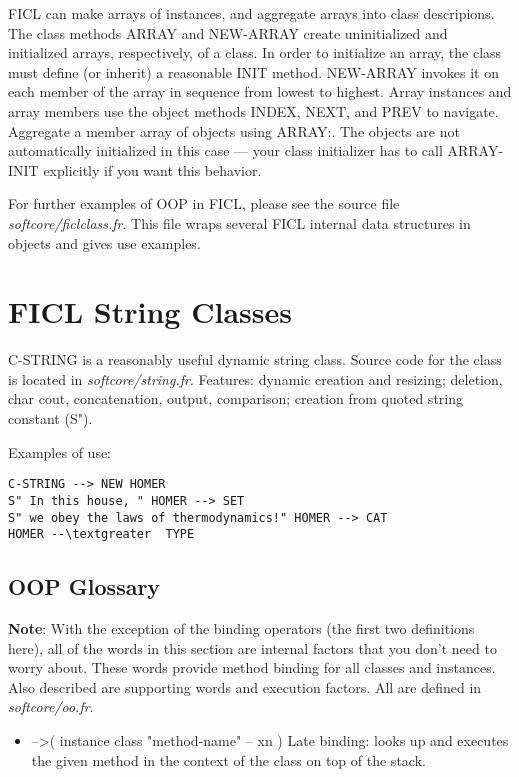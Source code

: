 \begin{;stlisting}[frame=single]
FICL can make arrays of instances, and aggregate arrays into class
descripions. The class methods ARRAY and NEW-ARRAY create uninitialized
and initialized arrays, respectively, of a class. In order to initialize
an array, the class must define (or inherit) a reasonable INIT method.
NEW-ARRAY invokes it on each member of the array in sequence from lowest
to highest. Array instances and array members use the object methods
INDEX, NEXT, and PREV to navigate. Aggregate a member array of objects
using ARRAY:. The objects are not automatically initialized in this
case — your class initializer has to call ARRAY-INIT explicitly if you
want this behavior.

For further examples of OOP in FICL, please see the source file
\textit{softcore/ficlclass.fr}. This file wraps several FICL internal
data structures in objects and gives use examples.


\section{FICL String Classes}
C-STRING is a reasonably useful dynamic string class. Source code for
the class is located in \textit{softcore/string.fr}. Features: dynamic
creation and resizing; deletion, char cout, concatenation, output,
comparison; creation from quoted string constant (S").

Examples of use:
\begin{lstlisting}[frame=single]
C-STRING --> NEW HOMER
S" In this house, " HOMER --> SET
S" we obey the laws of thermodynamics!" HOMER --> CAT
HOMER --\textgreater  TYPE
\end{lstlisting}


\subsection{OOP Glossary}
\textbf{Note}: With the exception of the binding operators (the first
two definitions here), all of the words in this section are internal
factors that you don't need to worry about. These words provide method
binding for all classes and instances. Also described are supporting
words and execution factors. All are defined in \textit{softcore/oo.fr}.
\begin{itemize}[noitemsep]
	\item --\textgreater  ( instance class "method-name" -- xn
		)\newline
	Late binding: looks up and executes the given method in the
	context of the class on top of the stack.


\end{itemize}
\end{;stlisting}

